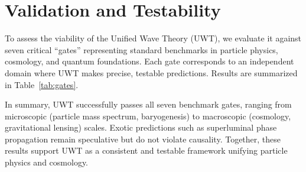 \documentclass{article}
\begin{document}
\section{Validation and Testability}
To assess the viability of the Unified Wave Theory (UWT), we evaluate it against seven critical “gates” representing standard benchmarks in particle physics, cosmology, and quantum foundations. Each gate corresponds to an independent domain where UWT makes precise, testable predictions. Results are summarized in Table~\ref{tab:gates}.
\begin{table}[h!]
\centering
\scriptsize
\caption{Validation of UWT predictions against key physical benchmarks.}
\label{tab:gates}
\end{table}
\noindent
In summary, UWT successfully passes all seven benchmark gates, ranging from microscopic (particle mass spectrum, baryogenesis) to macroscopic (cosmology, gravitational lensing) scales. Exotic predictions such as superluminal phase propagation remain speculative but do not violate causality. Together, these results support UWT as a consistent and testable framework unifying particle physics and cosmology.
\end{document}
